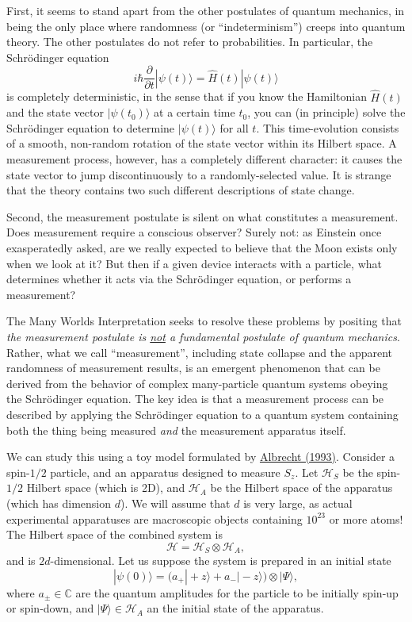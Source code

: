 \documentclass[pra,12pt]{revtex4}
\begin{document}
First, it seems to stand apart from the other postulates of quantum
mechanics, in being the only place where randomness (or
``indeterminism'') creeps into quantum theory.  The other postulates
do not refer to probabilities.  In particular, the Schr\"odinger equation
$$i\hbar\frac{\partial}{\partial t}|\psi(t)\rangle = \hat{H}(t) |\psi(t)\rangle$$
is completely deterministic, in the sense that if you know the
Hamiltonian $\hat{H}(t)$ and the state vector $|\psi(t_0)\rangle$ at a
certain time $t_0$, you can (in principle) solve the Schr\"odinger
equation to determine $|\psi(t)\rangle$ for all $t$.  This
time-evolution consists of a smooth, non-random rotation of the state
vector within its Hilbert space.  A measurement process, however, has
a completely different character: it causes the state vector to jump
discontinuously to a randomly-selected value.  It is strange that the
theory contains two such different descriptions of state change.

Second, the measurement postulate is silent on what constitutes a
measurement.  Does measurement require a conscious observer?  Surely
not: as Einstein once exasperatedly asked, are we really expected to
believe that the Moon exists only when we look at it?  But then if a
given device interacts with a particle, what determines whether it
acts via the Schr\"odinger equation, or performs a measurement?

The Many Worlds Interpretation seeks to resolve these problems by
positing that \textit{the measurement postulate is \underline{not} a
  fundamental postulate of quantum mechanics}.  Rather, what we call
``measurement'', including state collapse and the apparent randomness
of measurement results, is an emergent phenomenon that can be derived
from the behavior of complex many-particle quantum systems obeying the
Schr\"odinger equation.  The key idea is that a measurement process
can be described by applying the Schr\"odinger equation to a quantum
system containing both the thing being measured \textit{and} the
measurement apparatus itself.

We can study this using a toy model formulated by
\hyperref[cite:albrecht]{Albrecht (1993)}.  Consider a spin-$1/2$
particle, and an apparatus designed to measure $S_z$.  Let
$\mathscr{H}_S$ be the spin-$1/2$ Hilbert space (which is 2D), and
$\mathscr{H}_A$ be the Hilbert space of the apparatus (which has
dimension $d$).  We will assume that $d$ is very large, as actual
experimental apparatuses are macroscopic objects containing $10^{23}$
or more atoms!  The Hilbert space of the combined system is
$$\mathscr{H} = \mathscr{H}_S \otimes \mathscr{H}_A,$$
and is $2d$-dimensional.  Let us suppose the system is prepared in an initial
state
$$|\psi(0)\rangle = \Big(a_+ |\!+z\rangle + a_- |\!-z\rangle\Big) \otimes |\Psi\rangle,$$
where $a_\pm\in\mathbb{C}$ are the quantum amplitudes for the particle
to be initially spin-up or spin-down, and $|\Psi\rangle \in
\mathscr{H}_A$ an the initial state of the apparatus.
\end{document}
